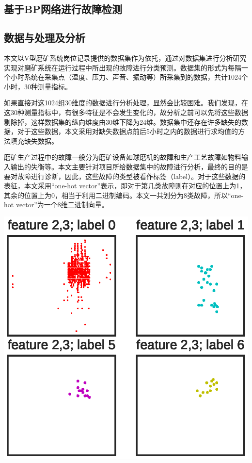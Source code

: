 \documentclass{ctacn}%
\begin{document}
\begin{multicols}{2}


\section{基于BP网络进行故障检测}

\subsection{数据与处理及分析}
本文以V型磨矿系统岗位记录提供的数据集作为依托，通过对数据集进行分析研究实现对磨矿系统在运行过程中所出现的故障进行分类预测。数据集的形式为每隔一个小时系统在采集点（温度、压力、声音、振动等）所采集到的数据，共计1024个小时，30种测量指标。

如果直接对这1024组30维度的数据进行分析处理，显然会比较困难。我们发现，在这30种测量指标中，有很多特征是不会发生变化的，故分析之前可以先将这些数据剔除掉，这样数据集的纵向维度由30维下降为24维。数据集中还存在许多缺失的数据，对于这些数据，本文采用对缺失数据点前后5小时之内的数据进行求均值的方法填充缺失数据。

磨矿生产过程中的故障一般分为磨矿设备如球磨机的故障和生产工艺故障如物料输入输出的失衡等。本文主要针对项目所给数据集中的故障进行分析，最终的目的是要对故障进行诊断，因此，这些故障的类型被看作标签（label）。对于这些数据的表征，本文采用“one-hot vector”表示，即对于第几类故障则在对应的位置上为1，其余的位置上为0，相当于利用二进制编码。本文一共划分为8类故障，所以“one-hot vector”为一个8维二进制向量。

\begin{center}
	\includegraphics[scale=0.7, trim=0 0 0 0]{figs/data_features}\\
	\label{fig1}
\end{center}


\end{multicols}
\end{document}
